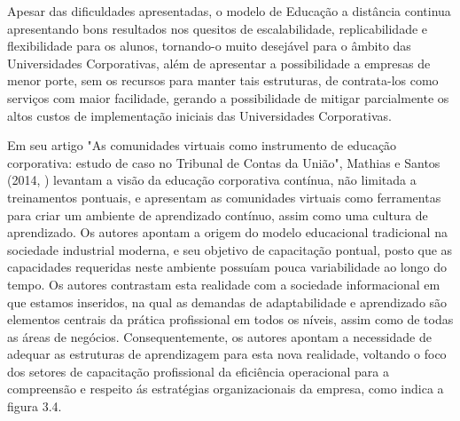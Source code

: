 Apesar das dificuldades apresentadas, o modelo de Educação a distância continua apresentando bons resultados nos quesitos de escalabilidade, replicabilidade e flexibilidade para os alunos, tornando-o muito desejável para o âmbito das Universidades Corporativas, além de apresentar a possibilidade a empresas de menor porte, sem os recursos para manter tais estruturas, de contrata-los como serviços com maior facilidade, gerando a possibilidade de mitigar parcialmente os altos custos de implementação iniciais das Universidades Corporativas. 

Em seu artigo "As comunidades virtuais como instrumento de educação corporativa: estudo de caso no Tribunal de Contas da União", Mathias e Santos (2014, \cite{Mathias_Santos_2014}) levantam a visão da educação corporativa contínua, não limitada a treinamentos  pontuais, e apresentam as comunidades virtuais  como ferramentas para criar um ambiente de aprendizado contínuo, assim como uma cultura de aprendizado. Os autores apontam a origem do modelo educacional tradicional na sociedade industrial moderna, e seu objetivo de capacitação pontual, posto que as capacidades requeridas neste ambiente possuíam pouca variabilidade ao longo do tempo. Os autores contrastam esta realidade com a sociedade informacional em que estamos inseridos, na qual as demandas de adaptabilidade e aprendizado são elementos centrais da prática profissional em todos os níveis, assim como de todas as áreas de negócios. Consequentemente, os autores apontam a necessidade de adequar as estruturas de aprendizagem para esta nova realidade, voltando o foco dos setores de capacitação profissional da eficiência operacional para a compreensão e respeito ás estratégias organizacionais da empresa, como indica a figura 3.4.

